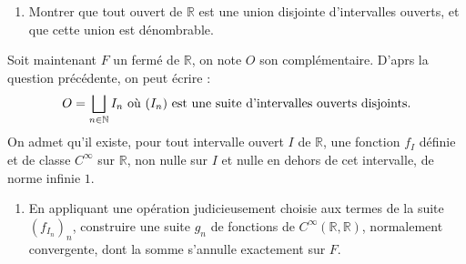 \begin{exer}
\begin{enumerate}
\item Montrer que tout ouvert de $\mathbb{R}$ est une union disjointe d'intervalles ouverts, et que cette union est d\'enombrable.
\end{enumerate}
\setcounter{stock}{\value{enumi}}
Soit maintenant $F$ un ferm\'e de $\mathbb{R}$, on note $O$ son compl\'ementaire. D'aprs la question pr\'ec\'edente, on peut \'ecrire :
\[O=\bigsqcup\limits_{n\in\mathbb{N}}I_n\text{ o\`u $(I_n)$ est une suite d'intervalles ouverts disjoints.}\] 
On admet qu'il existe, pour tout intervalle ouvert $I$ de $\mathbb{R}$, une fonction $f_I$ d\'efinie et de classe $C^{\infty}$ sur $\mathbb{R}$, %
non nulle sur $I$ et nulle en dehors de cet intervalle, de norme infinie $1$.
\begin{enumerate}
\setcounter{enumi}{\value{stock}}
\item En appliquant une op\'eration judicieusement choisie aux termes de la suite $(f_{I_n})_n$, construire une suite $g_n$ de fonctions de $C^{\infty}(\mathbb{R},\mathbb{R})$, normalement convergente, %
dont la somme s'annulle exactement sur $F$.


\end{enumerate}
\end{exer}
